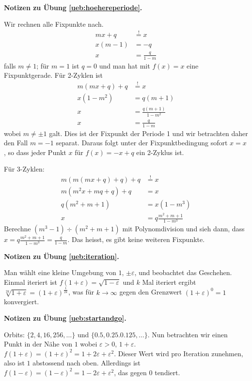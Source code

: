 \documentclass[%
11pt,%
twoside,%
titlepage,%
german,%
headsepline%
]{scrartcl}
\newcommand{\concatueb}[1]{ueb:#1}%
\newcommand{\concatlsg}[1]{lsg:#1}%
\newenvironment{lsg}[1]{%
    \par\noindent\textbf{Notizen zu Übung \ref{\concatueb{#1}}.}%
    \label{\concatlsg{#1}}
}{%
    \par%
}
\begin{document}
\begin{lsg}{hoehereperiode}
Wir rechnen alle Fixpunkte nach.
\begin{align*}
mx+q &\stackrel{!}{=} x\\
x(m-1) &= -q\\
x &= \frac{q}{1-m}
\end{align*}
falls $m\neq1$; für $m=1$ ist $q=0$ und man hat mit $f(x)=x$ eine Fixpunktgerade. Für 2-Zyklen ist
\begin{align*}
m(mx+q)+q &\stackrel{!}{=} x\\
x(1-m^2) &= q(m+1)\\
x &= \frac{q(m+1)}{1-m^2}\\
x &= \frac{q}{1-m}
\end{align*}
wobei $m\neq\pm1$ galt. Dies ist der Fixpunkt der Periode 1 und wir betrachten daher den Fall $m=-1$ separat. Daraus folgt unter der Fixpunktbedingung sofort $x=x$, so dass jeder Punkt $x$ für $f(x)=-x+q$ ein 2-Zyklus ist.

Für 3-Zyklen:
\begin{align*}
m(m(mx+q)+q)+q &\stackrel{!}{=} x\\
m(m^2x+mq+q)+q &= x\\
q(m^2+m+1) &= x(1-m^3)\\
x &= q\frac{m^2+m+1}{1-m^3}
\end{align*}
Berechne $(m^3-1)\div(m^2+m+1)$ mit Polynomdivision und sieh dann, dass $x= q\frac{m^2+m+1}{1-m^3}=\frac{q}{1-m}$. Das heisst, es gibt keine weiteren Fixpunkte.
\end{lsg}
\begin{lsg}{iteration}
Man wählt eine kleine Umgebung von $1$, $\pm\varepsilon$, und beobachtet das Geschehen. Einmal iteriert ist $f(1+\varepsilon)=\sqrt{1-\varepsilon}$ und $k$ Mal iteriert ergibt $\sqrt[2k]{1+\varepsilon}=(1+\varepsilon)^{\frac{1}{2k}}$, was für $k\to\infty$ gegen den Grenzwert $(1+\varepsilon)^{0}=1$ konvergiert.
\end{lsg}
\begin{lsg}{startandgo}
Orbits: $\{2,4,16,256,\dots\}$ und $\{0.5,0.25.0.125,\dots\}$. Nun betrachten wir einen Punkt in der Nähe von $1$ wobei $\varepsilon>0$, $1+\varepsilon$. $f(1+\varepsilon)=(1+\varepsilon)^2=1+2\varepsilon+\varepsilon^2$. Dieser Wert wird pro Iteration zunehmen, also ist $1$ abstossend nach oben. Allerdings ist $f(1-\varepsilon)=(1-\varepsilon)^2=1-2\varepsilon+\varepsilon^2$, das gegen $0$ tendiert.
\end{lsg}
\end{document}
